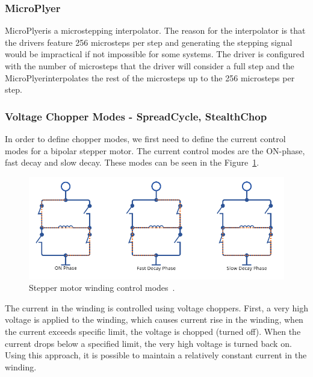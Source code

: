 \subsubsection{MicroPlyer\texttrademark}
MicroPlyer\texttrademark is a microstepping interpolator.
The reason for the interpolator is that the drivers feature 256 microsteps per step and generating the stepping signal would be impractical if not impossible for some systems.
The driver is configured with the number of microsteps that the driver will consider a full step and the MicroPlyer\texttrademark interpolates the rest of the microsteps up to the 256 microsteps per step\cite{trinamic_microstepping_nodate}.

\subsubsection{Voltage Chopper Modes - SpreadCycle\texttrademark, StealthChop\texttrademark}
In order to define chopper modes, we first need to define the current control modes for a bipolar stepper motor.
The current control modes are the ON-phase, fast decay and slow decay.
These modes can be seen in the Figure~\ref{fig:current_phases}.

\begin{figure}[H]
    \centering
    \includegraphics[width=\textwidth]{obrazky/winding_modes}
    \caption{Stepper motor winding control modes~\cite{trinamic_chopper_nodate}.}
    \label{fig:current_phases}
\end{figure}

The current in the winding is controlled using voltage choppers.
First, a very high voltage is applied to the winding, which causes current rise in the winding, when the current exceeds specific limit, the voltage is chopped (turned off).
When the current drops below a specified limit, the very high voltage is turned back on.
Using this approach, it is possible to maintain a relatively constant current in the winding\cite{trinamic_chopper_nodate}.

